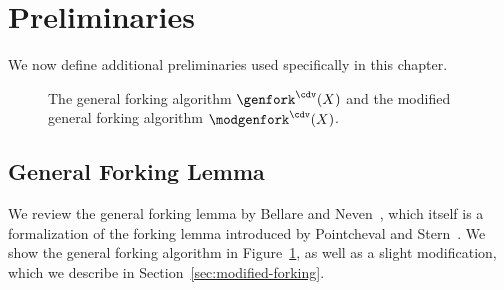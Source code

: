 \section{Preliminaries}

We now define additional preliminaries used specifically in this chapter.



\begin{figure}[t]
\begin{pcvstack}[boxed,center,space=1em]
    \centering
\end{pcvstack}
    \caption{
    The general forking algorithm $\genfork^\cdv(X)$ and the modified general forking algorithm $\modgenfork^\cdv(X)$.
    }
    \label{fg:gen-fork-mod}
\end{figure}




\subsection{General Forking Lemma}
\label{mod-fork}



We review the general forking lemma by Bellare and Neven~\cite{BellareN06}, which itself is a formalization of the forking lemma  introduced by Pointcheval and Stern~\cite{PointchevalS96}.
We show the general forking algorithm in Figure~\ref{fg:gen-fork-mod},
as well as a slight modification,
which we describe in Section~\ref{sec:modified-forking}.


